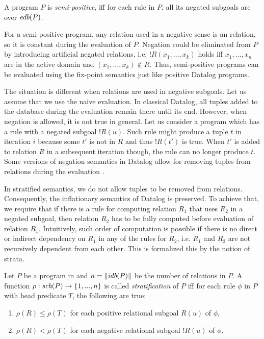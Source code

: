 \begin{defn}
A \datalogneg program $P$ is \emph{semi-positive}, iff for each rule in $P$, all its negated subgoals are over $\textit{edb}(P)$.
\end{defn}

For a semi-positive program, any relation used in a negative sense is an \edb relation, so it is constant during the evaluation of $P$. Negation could be eliminated from $P$ by introducing artificial negated \edb relations, i.e. $!R(x_1, \dots, x_k)$ holds iff $x_1, \dots, x_n$ are in the active domain and $(x_1, \dots, x_k) \notin R$. Thus, semi-positive programs can be evaluated using the fix-point semantics just like positive Datalog programs.

The situation is different when \idb relations are used in negative subgoals. Let us assume that we use the naive evaluation. In classical Datalog, all tuples added to the database during the evaluation remain there until its end. However, when negation is allowed, it is not true in general. Let us consider a program which has a rule with a negated subgoal $!R(u)$. Such rule might produce a tuple $t$ in iteration $i$ because some $t'$ is not in $R$ and thus $!R(t')$ is true. When $t'$ is added to relation $R$ in a subsequent iteration though, the rule can no longer produce $t$. Some versions of negation semantics in Datalog allow for removing tuples from relations during the evaluation \cite{fod}.

In stratified semantics, we do not allow tuples to be removed from relations. Consequently, the inflationary semantics of Datalog is preserved. To achieve that, we require that if there is a rule for computing relation $R_1$ that uses $R_2$ in a negated subgoal, then relation $R_2$ has to be fully computed before evaluation of relation $R_1$. Intuitively, such order of computation is possible if there is no direct or indirect dependency on $R_1$ in any of the rules for $R_2$, i.e. $R_1$ and $R_2$ are not recursively dependent from each other. This is formalized this by the notion of strata.

\begin{defn}[Stratification]
Let $P$ be a program in \datalogneg and $n = \|\textit{idb}(P)\|$ be the number of \idb relations in $P$. A function $\rho : \textit{sch}(P) \to \{1, . . . , n\}$ is called \emph{stratification} of $P$ iff for each rule $\phi$ in $P$ with head predicate $T$, the following are true: 

\begin{enumerate}
\item $\rho(R) \le \rho(T)$ for each positive relational subgoal $R(u)$ of $\phi$,
\item $\rho(R) < \rho(T)$ for each negative relational subgoal $!R(u)$ of $\phi$.
\end{enumerate}
\end{defn}

